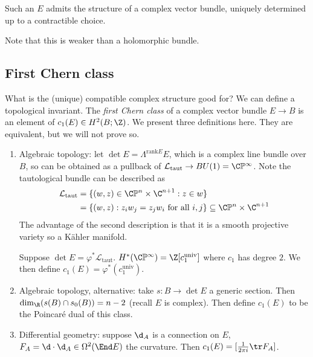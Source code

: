 \documentclass[a4paper]{article}
\renewcommand*{\P}{\mathbb{P}}
\begin{document}
\begin{corollary}
  Such an \(E\) admits the structure of a complex vector bundle, uniquely determined up to a contractible choice.
\end{corollary}

Note that this is weaker than a holomorphic bundle.

\subsection{First Chern class}

What is the (unique) compatible complex structure good for? We can define a topological invariant. The \emph{first Chern class} of a complex vector bundle \(E \to B\) is an element of \(c_1(E) \in H^2(B; \Z)\). We present three definitions here. They are equivalent, but we will not prove so.
\begin{enumerate}
\item Algebraic topology: let \(\det E = \Lambda^{\mathrm{rank} E}E\), which is a complex line bundle over \(B\), so can be obtained as a pullback of \(\mathcal L_{\mathrm{taut}} \to BU(1) = \C\P^\infty\). Note the tautological bundle can be described as
  \begin{align*}
    \mathcal L_{\mathrm{taut}}
    &= \{(w, z) \in \C\P^n \times \C^{n + 1}: z \in w\} \\
    &= \{(w, z): z_iw_j = z_jw_i \text{ for all } i, j\} \subseteq \C\P^n \times \C^{n + 1}
  \end{align*}
  The advantage of the second description is that it is a smooth projective variety so a Kähler manifold.

  Suppose \(\det E = \varphi^* \mathcal L_{\mathrm{taut}}\). \(H^*(\C\P^\infty) = \Z[c_1^{\mathrm{univ}}]\) where \(c_1\) has degree \(2\). We then define \(c_1(E) = \varphi^*(c_1^{\mathrm{univ}})\).
\item Algebraic topology, alternative: take \(s: B \to \det E\) a generic section. Then \(\dim_\R(s(B) \cap s_0(B)) = n - 2\) (recall \(E\) is complex). Then define \(c_1(E)\) to be the Poincaré dual of this class.
\item Differential geometry: suppose \(\d_A\) is a connection on \(E\), \(F_A = \d \cdot \d_A \in \Omega^2(\End E)\) the curvature. Then \(c_1(E) = [\frac{1}{2\pi i} \tr F_A]\).
\end{enumerate}
\end{document}
